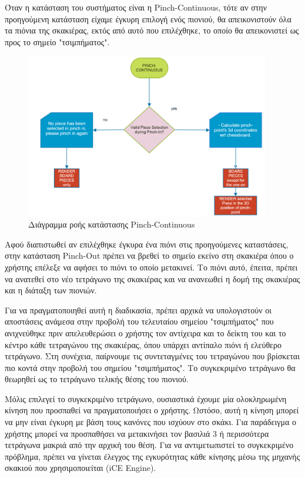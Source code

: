 Όταν η κατάσταση του συστήματος είναι η Pinch-Continuous, τότε αν στην προηγούμενη κατάσταση είχαμε έγκυρη επιλογή ενός πιονιού, θα απεικονιστούν όλα τα πιόνια της σκακιέρας, εκτός από αυτό που επιλέχθηκε, το οποίο θα απεικονιστεί ως προς το σημείο "τσιμπήματος". 

\begin{figure}[H]
    \centering
    \includegraphics[width=0.95\textwidth]{Files/Figures/pinch_continuous_state.pdf}
    \caption[Διάγραμμα ροής κατάστασης Pinch-Continuous]{Διάγραμμα ροής κατάστασης Pinch-Continuous}
    \label{fig:pinch-continuous}
\end{figure}



Αφού διαπιστωθεί αν επιλέχθηκε έγκυρα ένα πιόνι στις προηγούμενες καταστάσεις, στην κατάσταση Pinch-Out πρέπει να βρεθεί το σημείο εκείνο στη σκακιέρα όπου ο χρήστης επέλεξε να αφήσει το πιόνι το οποίο μετακινεί. Το πιόνι αυτό, έπειτα, πρέπει να ανατεθεί στο νέο τετράγωνο της σκακιέρας και να ανανεωθεί η δομή της σκακιέρας και η διάταξη των πιονιών.

Για να πραγματοποιηθεί αυτή η διαδικασία, πρέπει αρχικά να υπολογιστούν οι αποστάσεις ανάμεσα στην προβολή του τελευταίου σημείου "τσιμπήματος" που ανιχνεύθηκε πριν απελευθερώσει ο χρήστης τον αντίχειρα και το δείκτη του και το κέντρο κάθε τετραγώνου της σκακιέρας, όπου υπάρχει αντίπαλο πιόνι ή ελεύθερο τετράγωνο. Στη συνέχεια, παίρνουμε τις συντεταγμένες του τετραγώνου που βρίσκεται πιο κοντά στην προβολή του σημείου "τσιμπήματος". Το συγκεκριμένο τετράγωνο θα θεωρηθεί ως το τετράγωνο τελικής θέσης του πιονιού. 


Μόλις επιλεγεί το συγκεκριμένο τετράγωνο, ουσιαστικά έχουμε μία ολοκληρωμένη κίνηση που προσπαθεί να πραγματοποιήσει ο χρήστης. Ωστόσο, αυτή η κίνηση μπορεί να μην είναι έγκυρη με βάση τους κανόνες που ισχύουν στο σκάκι. Για παράδειγμα ο χρήστης μπορεί να προσπαθήσει να μετακινήσει τον βασιλιά 3 ή περισσότερα τετράγωνα μακριά από την αρχική του θέση. Για να αντιμετωπιστεί το συγκεκριμένο πρόβλημα, πρέπει να γίνεται έλεγχος της εγκυρότητας κάθε κίνησης μέσω της μηχανής σκακιού που χρησιμοποιείται (iCE Engine). 


